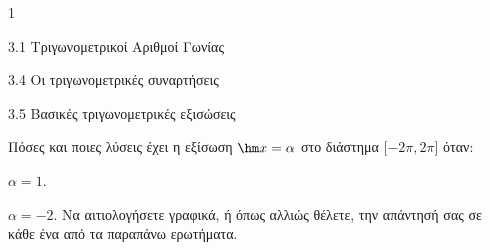 \begin{ylh}{1}
\item 3.1 Τριγωνομετρικοί Αριθμοί Γωνίας
\item 3.4 Οι τριγωνομετρικές συναρτήσεις
\item 3.5 Βασικές τριγωνομετρικές εξισώσεις
\end{ylh}
Πόσες και ποιες λύσεις έχει η εξίσωση $\hm  x = \alpha$ στο διάστημα $\lbrack - 2\pi,2\pi\rbrack$ όταν:
\begin{alist}
\item $\alpha = 1$.
\item $\alpha = - 2$.
Να αιτιολογήσετε γραφικά, ή όπως αλλιώς θέλετε, την απάντησή σας σε κάθε ένα από τα παραπάνω ερωτήματα.
\end{alist}

